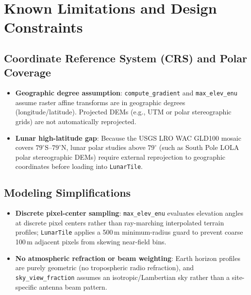 \documentclass[11pt,letterpaper]{article}
\begin{document}
\section{Known Limitations and Design Constraints}

\subsection{Coordinate Reference System (CRS) and Polar Coverage}
\begin{itemize}
  \item \textbf{Geographic degree assumption}: \texttt{compute\_gradient} and \texttt{max\_elev\_enu} assume raster affine transforms are in geographic degrees (longitude/latitude). Projected DEMs (e.g., UTM or polar stereographic grids) are not automatically reprojected.
  \item \textbf{Lunar high-latitude gap}: Because the USGS LRO WAC GLD100 mosaic covers $79^\circ\text{S}$--$79^\circ\text{N}$, lunar polar studies above $79^\circ$ (such as South Pole LOLA polar stereographic DEMs) require external reprojection to geographic coordinates before loading into \texttt{LunarTile}.
\end{itemize}

\subsection{Modeling Simplifications}
\begin{itemize}
  \item \textbf{Discrete pixel-center sampling}: \texttt{max\_elev\_enu} evaluates elevation angles at discrete pixel centers rather than ray-marching interpolated terrain profiles; \texttt{LunarTile} applies a 500\,m minimum-radius guard to prevent coarse 100\,m adjacent pixels from skewing near-field bins.
  \item \textbf{No atmospheric refraction or beam weighting}: Earth horizon profiles are purely geometric (no tropospheric radio refraction), and \texttt{sky\_view\_fraction} assumes an isotropic/Lambertian sky rather than a site-specific antenna beam pattern.
\end{itemize}
\end{document}
